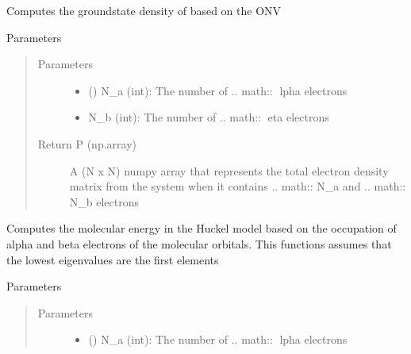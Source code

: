 \documentclass[letterpaper,10pt,english]{sphinxmanual}
\begin{document}
\begin{fulllineitems}
\begin{fulllineitems}
\label{\detokenize{modules/gqcml.data_generators:gqcml.data_generators.Huckel.HuckelSolver.compute_density_matrix}}
Computes the groundstate density of based on the ONV

Parameters
\begin{quote}\begin{description}
\item[{Parameters}] \leavevmode\begin{itemize}
\item {} 
 () \textendash{} N\_a (int): The number of .. math:: lpha electrons

\item {} 
 \textendash{} N\_b (int): The number of .. math:: eta electrons

\end{itemize}

\item[{Return P (np.array)}] \leavevmode
A (N x N) numpy array that represents the total electron density matrix from the system
when it contains .. math:: N\_a and .. math:: N\_b electrons

\end{description}\end{quote}

\end{fulllineitems}


\begin{fulllineitems}
\label{\detokenize{modules/gqcml.data_generators:gqcml.data_generators.Huckel.HuckelSolver.compute_energy}}
Computes the molecular energy in the Huckel model based on the occupation of
alpha and beta electrons of the molecular orbitals. This functions assumes that
the lowest eigenvalues are the first elements

Parameters
\begin{quote}\begin{description}
\item[{Parameters}] \leavevmode\begin{itemize}
\item {} 
 () \textendash{} N\_a (int): The number of .. math:: lpha electrons


\end{itemize}
\end{description}
\end{quote}
\end{fulllineitems}
\end{fulllineitems}
\end{document}
